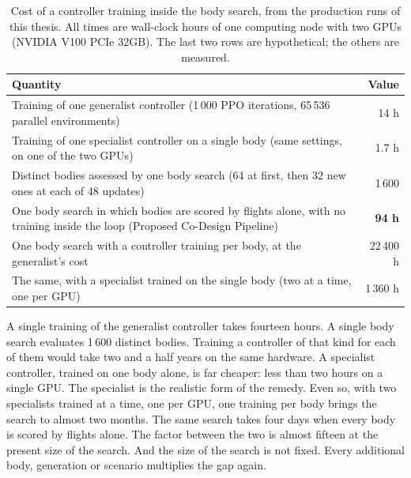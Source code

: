 \begin{table}[htbp]
\centering
\begin{tabularx}{\textwidth}{>{\raggedright\arraybackslash}X r}
\hline
Quantity & Value \\
\hline
Training of one generalist controller (1\,000 PPO iterations, 65\,536 parallel environments) & 14 h \\
Training of one specialist controller on a single body (same settings, on one of the two GPUs) & 1.7 h \\
\hline
Distinct bodies assessed by one body search (64 at first, then 32 new ones at each of 48 updates) & 1\,600 \\
One body search in which bodies are scored by flights alone, with no training inside the loop (Proposed Co-Design Pipeline) & \textbf{94 h} \\
One body search with a controller training per body, at the generalist's cost & 22\,400 h \\
The same, with a specialist trained on the single body (two at a time, one per GPU) & 1\,360 h \\
\hline
\end{tabularx}
\caption[Cost of a controller training inside the body search]{Cost of a controller training inside the body search, from the production runs of this thesis. All times are wall-clock hours of one computing node with two GPUs (NVIDIA V100 PCIe 32GB). The last two rows are hypothetical; the others are measured.}
\label{tab:feasibility}
\end{table}

A single training of the generalist controller takes fourteen hours. A single body search evaluates 1\,600 distinct bodies. Training a controller of that kind for each of them would take two and a half years on the same hardware. A specialist controller, trained on one body alone, is far cheaper: less than two hours on a single GPU. The specialist is the realistic form of the remedy. Even so, with two specialists trained at a time, one per GPU, one training per body brings the search to almost two months. The same search takes four days when every body is scored by flights alone. The factor between the two is almost fifteen at the present size of the search. And the size of the search is not fixed. Every additional body, generation or scenario multiplies the gap again.

